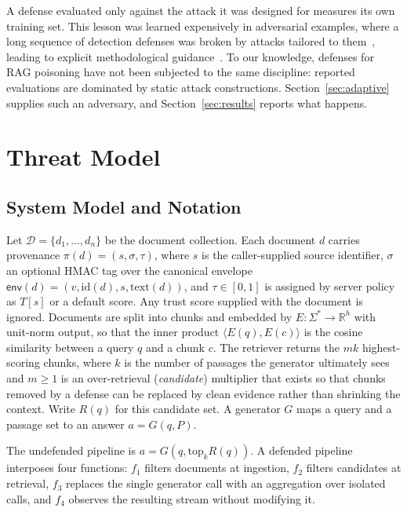 A defense evaluated only against the attack it was designed for measures its own training set.
This lesson was learned expensively in adversarial examples, where a long sequence of detection
defenses was broken by attacks tailored to
them~\citep{carlini2017bypassing,athalye2018obfuscated,tramer2020adaptive}, leading to explicit
methodological guidance~\citep{carlini2019evaluating}. To our knowledge, defenses for RAG
poisoning have not been subjected to the same discipline: reported evaluations are dominated by
static attack constructions. Section~\ref{sec:adaptive} supplies such an adversary, and
Section~\ref{sec:results} reports what happens.

\section{Threat Model}
\label{sec:threat}

\subsection{System Model and Notation}

Let $\mathcal{D} = \{d_1, \dots, d_n\}$ be the document collection. Each document $d$ carries
provenance $\pi(d) = (s, \sigma, \tau)$, where $s$ is the caller-supplied source identifier,
$\sigma$ an optional HMAC tag over the canonical envelope
$\mathsf{env}(d) = (v, \mathrm{id}(d), s, \mathrm{text}(d))$, and $\tau \in [0,1]$ is
assigned by server policy as $T[s]$ or a default score. Any trust score supplied with the
document is ignored. Documents are split into chunks and embedded by
$E : \Sigma^{*} \rightarrow \mathbb{R}^{h}$ with unit-norm output, so that the inner product
$\langle E(q), E(c) \rangle$ is the cosine similarity between a query $q$ and a chunk $c$. The
retriever returns the $mk$ highest-scoring chunks, where $k$ is the number of passages the
generator ultimately sees and $m \ge 1$ is an over-retrieval (\emph{candidate}) multiplier that
exists so that chunks removed by a defense can be replaced by clean evidence rather than
shrinking the context. Write $R(q)$ for this candidate set. A generator $G$ maps a query and a
passage set to an answer $a = G(q, P)$.

The undefended pipeline is $a = G\!\left(q, \mathrm{top}_k R(q)\right)$. A defended pipeline
interposes four functions: $f_1$ filters documents at ingestion, $f_2$ filters candidates at
retrieval, $f_3$ replaces the single generator call with an aggregation over isolated calls,
and $f_4$ observes the resulting stream without modifying it.

